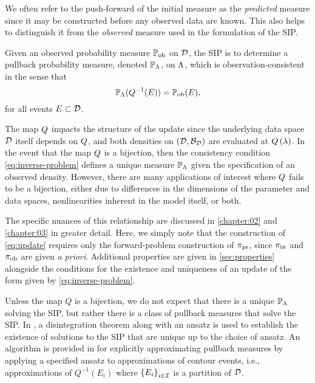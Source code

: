 We often refer to the push-forward of the initial measure as the {\em predicted} measure since it may be constructed before any observed data are known.
This also helps to distinguish it from the {\em observed} measure used in the formulation of the SIP.
\begin{definition}\label{def:inverse-problem}
Given an observed probability measure $\operatorname*{\mathbb{P}_{ob}}$ on $\mathcal{D}$, the SIP is to determine a pullback probability measure, denoted $\mathbb{P}_{\Lambda}$, on ${\Lambda}$, which is observation-consistent in the sense that
\begin{equation}\label{eq:data-consistent}
\mathbb{P}_{\Lambda}(Q^{-1}(E)) = \operatorname*{\mathbb{P}_{ob}}(E),
\end{equation}
for all events $E\subset\mathcal{D}$.
\end{definition}



The map $Q$ impacts the structure of the update since the underlying data space $\mathcal{D}$ itself depends on $Q$, and both densities on $(\mathcal{D}, \mathcal{B}_{\mathcal{D}})$ are evaluated at $Q\left ( \lambda \right )$.
In the event that the map $Q$ is a bijection, then the consistency condition \eqref{eq:inverse-problem} defines a unique measure $\mathbb{P}_{\Lambda}$ given the specification of an observed density.
However, there are many applications of interest where $Q$ fails to be a bijection, either due to differences in the dimensions of the parameter and data spaces, nonlinearities inherent in the model itself, or both.


The specific nuances of this relationship are discussed in \ref{chapter:02} and \ref{chapter:03} in greater detail.
Here, we simply note that the construction of \eqref{eq:update} requires only the forward-problem construction of $\operatorname*{\pi_{pr}}$, since $\operatorname*{\pi_{in}}$ and $\operatorname*{\pi_{ob}}$ are given \emph{a priori}.
Additional properties are given in \ref{sec:properties} alongside the conditions for the existence and uniqueness of an update of the form given by \eqref{eq:inverse-problem}.



Unless the map $Q$ is a bijection, we do not expect that there is a unique $\mathbb{P}_{\Lambda}$ solving the SIP, but rather there is a class of pullback measures that solve the SIP.
In \cite{BET+14}, a disintegration theorem \cite{Chang_Pollard} along with an ansatz is used to establish the existence of solutions to the SIP that are unique up to the choice of ansatz.
An algorithm is provided in \cite{BET+14} for explicitly approximating pullback measures by applying a specified ansatz to approximations of contour events, i.e., approximations of $Q^{-1}(E_i)$ where $\left\{E_i\right\}_{i\in\mathcal{I}}$ is a partition of $\mathcal{D}$.

